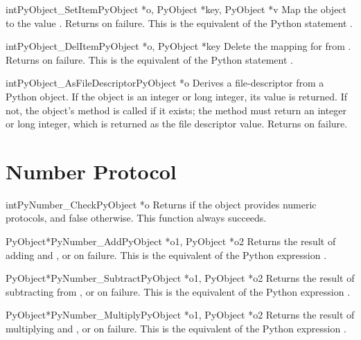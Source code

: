 \documentclass{manual}
\begin{document}
\begin{cfuncdesc}{int}{PyObject_SetItem}{PyObject *o, PyObject *key, PyObject *v}
Map the object  to the value .
Returns  on failure.  This is the equivalent
of the Python statement .
\end{cfuncdesc}


\begin{cfuncdesc}{int}{PyObject_DelItem}{PyObject *o, PyObject *key}
Delete the mapping for  from .  Returns  on
failure. This is the equivalent of the Python statement .
\end{cfuncdesc}

\begin{cfuncdesc}{int}{PyObject_AsFileDescriptor}{PyObject *o}
Derives a file-descriptor from a Python object.  If the object
is an integer or long integer, its value is returned.  If not, the
object's  method is called if it exists; the method
must return an integer or long integer, which is returned as the file
descriptor value.  Returns  on failure.
\end{cfuncdesc}

\section{Number Protocol \label{number}}

\begin{cfuncdesc}{int}{PyNumber_Check}{PyObject *o}
Returns  if the object  provides numeric protocols, and
false otherwise. 
This function always succeeds.
\end{cfuncdesc}


\begin{cfuncdesc}{PyObject*}{PyNumber_Add}{PyObject *o1, PyObject *o2}
Returns the result of adding  and , or \NULL{} on
failure.  This is the equivalent of the Python expression
.
\end{cfuncdesc}


\begin{cfuncdesc}{PyObject*}{PyNumber_Subtract}{PyObject *o1, PyObject *o2}
Returns the result of subtracting  from , or
\NULL{} on failure.  This is the equivalent of the Python expression
.
\end{cfuncdesc}


\begin{cfuncdesc}{PyObject*}{PyNumber_Multiply}{PyObject *o1, PyObject *o2}
Returns the result of multiplying  and , or \NULL{} on
failure.  This is the equivalent of the Python expression
.
\end{cfuncdesc}
\end{document}
